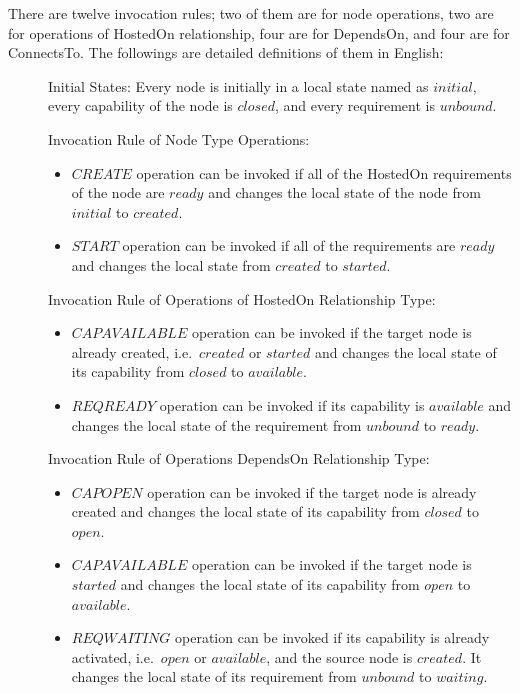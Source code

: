 \documentclass[12pt]{report}
\begin{document}
There are twelve invocation rules; two of them are for node
operations, two are for operations of HostedOn relationship, four are
for DependsOn, and four are for ConnectsTo. The followings are
detailed definitions of them in English:
\begin{description}
\item[]Initial States: Every node is initially in a local state named
  as $initial$, every capability of the node is $closed$, and every
  requirement is $unbound$.
\item[] Invocation Rule of Node Type Operations:
  \begin{itemize}
  \item $CREATE$ operation can be invoked if all of the HostedOn
    requirements of the node are $ready$ and changes the local state of the node from
    $initial$ to $created$.
  \item $START$ operation can be invoked if all of the requirements
    are $ready$ and changes the local state from $created$ to $started$.
  \end{itemize}
\item[] Invocation Rule of Operations of HostedOn Relationship Type:
  \begin{itemize}
  \item $CAPAVAILABLE$ operation can be invoked if the target node is
    already created, i.e.\ $created$ or $started$ and changes the local state
    of its capability from $closed$ to $available$.
  \item $REQREADY$ operation can be invoked if its capability is
    $available$ and changes the local state of the requirement from $unbound$
    to $ready$.
  \end{itemize}
\item[] Invocation Rule of Operations DependsOn Relationship Type:
  \begin{itemize}
  \item $CAPOPEN$ operation can be invoked if the target node is
    already created and changes the local state of its capability from
    $closed$ to $open$.
  \item $CAPAVAILABLE$ operation can be invoked if the target node is
    $started$ and changes the local state of its capability from
    $open$ to $available$.
  \item $REQWAITING$ operation can be invoked if its capability is already
    activated, i.e.\ $open$ or $available$, and the source node is
    $created$. It changes the local state of its requirement from
    $unbound$ to $waiting$.

\end{itemize}
\end{description}
\end{document}
